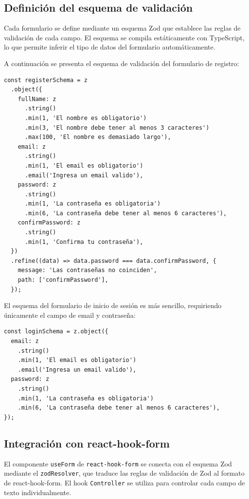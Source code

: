 \subsection{Definici\'on del esquema de validaci\'on}

Cada formulario se define mediante un esquema Zod que establece las reglas de
validaci\'on de cada campo. El esquema se compila est\'aticamente con
TypeScript, lo que permite inferir el tipo de datos del formulario
autom\'aticamente.

A continuaci\'on se presenta el esquema de validaci\'on del formulario de
registro:

\begin{lstlisting}
const registerSchema = z
  .object({
    fullName: z
      .string()
      .min(1, 'El nombre es obligatorio')
      .min(3, 'El nombre debe tener al menos 3 caracteres')
      .max(100, 'El nombre es demasiado largo'),
    email: z
      .string()
      .min(1, 'El email es obligatorio')
      .email('Ingresa un email valido'),
    password: z
      .string()
      .min(1, 'La contraseña es obligatoria')
      .min(6, 'La contraseña debe tener al menos 6 caracteres'),
    confirmPassword: z
      .string()
      .min(1, 'Confirma tu contraseña'),
  })
  .refine((data) => data.password === data.confirmPassword, {
    message: 'Las contraseñas no coinciden',
    path: ['confirmPassword'],
  });
\end{lstlisting}

El esquema del formulario de inicio de sesi\'on es m\'as sencillo, requiriendo
\'unicamente el campo de email y contrase\~na:

\begin{lstlisting}
const loginSchema = z.object({
  email: z
    .string()
    .min(1, 'El email es obligatorio')
    .email('Ingresa un email valido'),
  password: z
    .string()
    .min(1, 'La contraseña es obligatoria')
    .min(6, 'La contraseña debe tener al menos 6 caracteres'),
});
\end{lstlisting}

\subsection{Integraci\'on con react-hook-form}

El componente \texttt{useForm} de \texttt{react-hook-form} se conecta con el
esquema Zod mediante el \texttt{zodResolver}, que traduce las reglas de
validaci\'on de Zod al formato de react-hook-form. El hook \texttt{Controller}
se utiliza para controlar cada campo de texto individualmente.

